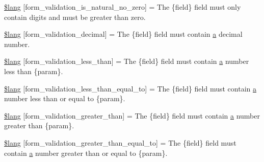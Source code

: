 \begin{DoxyCompactItemize}
\item 
\hyperlink{_admin_2system_2language_2english_2form__validation__lang_8php_a9cd7170707b93d47702698ff85d7ab9c}{\$lang} \mbox{[}\textquotesingle{}form\+\_\+validation\+\_\+is\+\_\+natural\+\_\+no\+\_\+zero\textquotesingle{}\mbox{]} = \textquotesingle{}The \{field\} field must only contain digits and must be greater than zero.\textquotesingle{}
\item 
\hyperlink{_admin_2system_2language_2english_2form__validation__lang_8php_aaa48b480326c914d9b8aa16cabdc11f7}{\$lang} \mbox{[}\textquotesingle{}form\+\_\+validation\+\_\+decimal\textquotesingle{}\mbox{]} = \textquotesingle{}The \{field\} field must contain \hyperlink{_admin_2assets_2js_2bootstrap_8min_8js_a1f5870dcf487187f13d5fd328ed9e6e7}{a} decimal number.\textquotesingle{}
\item 
\hyperlink{_admin_2system_2language_2english_2form__validation__lang_8php_aa3ee4ecc6cbaf35bf4708c7e8c2afcca}{\$lang} \mbox{[}\textquotesingle{}form\+\_\+validation\+\_\+less\+\_\+than\textquotesingle{}\mbox{]} = \textquotesingle{}The \{field\} field must contain \hyperlink{_admin_2assets_2js_2bootstrap_8min_8js_a1f5870dcf487187f13d5fd328ed9e6e7}{a} number less than \{param\}.\textquotesingle{}
\item 
\hyperlink{_admin_2system_2language_2english_2form__validation__lang_8php_a687b3be07540d640e2b308086c855c83}{\$lang} \mbox{[}\textquotesingle{}form\+\_\+validation\+\_\+less\+\_\+than\+\_\+equal\+\_\+to\textquotesingle{}\mbox{]} = \textquotesingle{}The \{field\} field must contain \hyperlink{_admin_2assets_2js_2bootstrap_8min_8js_a1f5870dcf487187f13d5fd328ed9e6e7}{a} number less than or equal to \{param\}.\textquotesingle{}
\item 
\hyperlink{_admin_2system_2language_2english_2form__validation__lang_8php_aa01f66851d0140114c2216e6ab5daf06}{\$lang} \mbox{[}\textquotesingle{}form\+\_\+validation\+\_\+greater\+\_\+than\textquotesingle{}\mbox{]} = \textquotesingle{}The \{field\} field must contain \hyperlink{_admin_2assets_2js_2bootstrap_8min_8js_a1f5870dcf487187f13d5fd328ed9e6e7}{a} number greater than \{param\}.\textquotesingle{}
\item 
\hyperlink{_admin_2system_2language_2english_2form__validation__lang_8php_a255dc63d9dceb22751acebc1ffc43be8}{\$lang} \mbox{[}\textquotesingle{}form\+\_\+validation\+\_\+greater\+\_\+than\+\_\+equal\+\_\+to\textquotesingle{}\mbox{]} = \textquotesingle{}The \{field\} field must contain \hyperlink{_admin_2assets_2js_2bootstrap_8min_8js_a1f5870dcf487187f13d5fd328ed9e6e7}{a} number greater than or equal to \{param\}.\textquotesingle{}

\end{DoxyCompactItemize}
